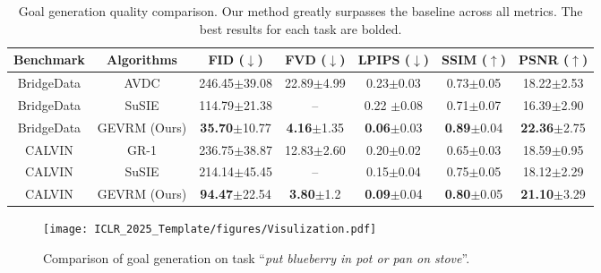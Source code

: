 \begin{table}\small
    \centering
    \caption{Goal generation quality comparison.
        Our method greatly surpasses the baseline across all metrics. 
    The best results for each task are bolded. 
    }
    \vspace{1em}
    \begin{tabular}{ccccccc}
     \toprule
        \textbf{Benchmark} & \textbf{Algorithms} & \textbf{FID} ($\downarrow$) & \textbf{FVD} ($\downarrow$) & \textbf{LPIPS} ($\downarrow$)& \textbf{SSIM} ($\uparrow$)& \textbf{PSNR} ($\uparrow$) \\ 
         \midrule
         BridgeData& AVDC  & 246.45$\pm${\scriptsize 39.08} & 22.89$\pm${\scriptsize 4.99} &0.23$\pm${\scriptsize 0.03}&  0.73$\pm${\scriptsize 0.05}&18.22$\pm${\scriptsize 2.53} \\ 
        BridgeData & SuSIE & 114.79$\pm${\scriptsize 21.38} & --               & 0.22 $\pm${\scriptsize 0.08} & 0.71$\pm${\scriptsize 0.07} & 16.39$\pm${\scriptsize 2.90} \\
        BridgeData&GEVRM (Ours) & \textbf{35.70}$\pm${\scriptsize 10.77}   & \textbf{4.16}$\pm${\scriptsize 1.35}&\textbf{0.06}$\pm${\scriptsize 0.03}&\textbf{0.89}$\pm${\scriptsize 0.04}& \textbf{22.36}$\pm${\scriptsize 2.75}\\ 
        \midrule
        CALVIN&GR-1  & 236.75$\pm${\scriptsize 38.87} &12.83$\pm${\scriptsize 2.60} &0.20$\pm${\scriptsize 0.02}&0.65$\pm${\scriptsize 0.03}&18.59$\pm${\scriptsize 0.95}\\ 
        CALVIN& SuSIE & 214.14$\pm${\scriptsize 45.45} & --               & 0.15$\pm${\scriptsize 0.04} & 0.75$\pm${\scriptsize 0.05} & 18.12$\pm${\scriptsize 2.29} \\
        CALVIN&GEVRM (Ours) & \textbf{94.47}$\pm${\scriptsize 22.54} & \textbf{3.80}$\pm${\scriptsize 1.2}&\textbf{0.09}$\pm${\scriptsize 0.04}&\textbf{0.80}$\pm${\scriptsize 0.05}&\textbf{21.10}$\pm${\scriptsize 3.29} \\ 
         \bottomrule
    \end{tabular}
       \label{tab:calvin_FID_FVD}
\end{table}
\begin{figure}
\centering
\texttt{[image: ICLR\_2025\_Template/figures/Visulization.pdf]}
\caption{
Comparison of goal generation on task “\textit{put blueberry in pot or pan on stove}”.
}
  \label{fig:Visualization of Bridge Data}
\end{figure}

